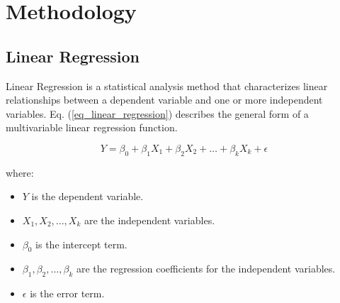 \documentclass[conference]{IEEEtran}
\begin{document}
\section{Methodology}
\subsection{Linear Regression}
Linear Regression is a statistical analysis method that characterizes linear relationships between a dependent variable and one or more independent variables. Eq. (\ref{eq_linear_regression}) describes the general form of a multivariable linear regression function.\par
\begin{equation}\label{eq_linear_regression}
Y = \beta_0 + \beta_1 X_1 + \beta_2 X_2 + \ldots + \beta_k X_k + \epsilon
\end{equation}\par
where:\par
\begin{itemize}
    \item \(Y\) is the dependent variable.\par
    \item \(X_1, X_2, ..., X_k\) are the independent variables.\par
    \item \(\beta_0\) is the intercept term.\par
    \item \(\beta_1, \beta_2, ..., \beta_k\) are the regression coefficients for the independent variables.\par
    \item \(\epsilon\) is the error term.
\end{itemize}
\end{document}
